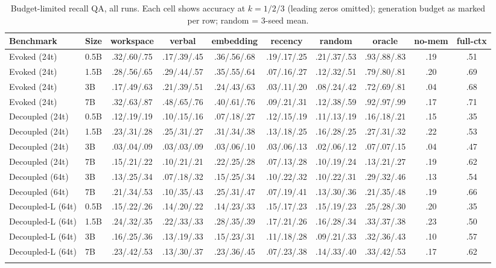 \begin{table}[h]
\centering
\caption{Budget-limited recall QA, all runs. Each cell shows accuracy at
$k{=}1/2/3$ (leading zeros omitted); generation budget
as marked per row; random = 3-seed mean.}
\label{tab:appA2}
\scriptsize
\setlength{\tabcolsep}{3.5pt}
\begin{tabular}{llcccccccc}
\toprule
Benchmark & Size & workspace & verbal & embedding & recency & random & oracle & no-mem & full-ctx \\
\midrule
Evoked (24t) & 0.5B & .32/.60/.75 & .17/.39/.45 & .36/.56/.68 & .19/.17/.25 & .21/.37/.53 & .93/.88/.83 & .19 & .51 \\
Evoked (24t) & 1.5B & .28/.56/.65 & .29/.44/.57 & .35/.55/.64 & .07/.16/.27 & .12/.32/.51 & .79/.80/.81 & .20 & .69 \\
Evoked (24t) & 3B & .17/.49/.63 & .21/.39/.51 & .24/.43/.63 & .03/.11/.20 & .08/.24/.42 & .72/.69/.81 & .04 & .68 \\
Evoked (24t) & 7B & .32/.63/.87 & .48/.65/.76 & .40/.61/.76 & .09/.21/.31 & .12/.38/.59 & .92/.97/.99 & .17 & .71 \\
\addlinespace
Decoupled (24t) & 0.5B & .12/.19/.19 & .10/.15/.16 & .07/.18/.27 & .12/.15/.19 & .11/.13/.19 & .16/.18/.21 & .15 & .35 \\
Decoupled (24t) & 1.5B & .23/.31/.28 & .25/.31/.27 & .31/.34/.38 & .13/.18/.25 & .16/.28/.25 & .27/.31/.32 & .22 & .53 \\
Decoupled (24t) & 3B & .03/.04/.09 & .03/.03/.09 & .03/.06/.10 & .03/.06/.13 & .02/.06/.12 & .07/.07/.15 & .04 & .47 \\
Decoupled (24t) & 7B & .15/.21/.22 & .10/.21/.21 & .22/.25/.28 & .07/.13/.28 & .10/.19/.24 & .13/.21/.27 & .19 & .62 \\
\addlinespace
Decoupled (64t) & 3B & .13/.25/.34 & .07/.18/.32 & .15/.25/.34 & .10/.22/.32 & .10/.22/.31 & .29/.32/.46 & .13 & .54 \\
Decoupled (64t) & 7B & .21/.34/.53 & .10/.35/.43 & .25/.31/.47 & .07/.19/.41 & .13/.30/.36 & .21/.35/.48 & .19 & .66 \\
\addlinespace
Decoupled-L (64t) & 0.5B & .15/.22/.26 & .14/.20/.22 & .14/.23/.33 & .15/.17/.23 & .15/.19/.23 & .25/.28/.30 & .20 & .35 \\
Decoupled-L (64t) & 1.5B & .24/.32/.35 & .22/.33/.33 & .28/.35/.39 & .17/.21/.26 & .16/.28/.34 & .33/.37/.38 & .23 & .50 \\
Decoupled-L (64t) & 3B & .16/.25/.36 & .13/.19/.33 & .15/.23/.31 & .11/.18/.28 & .09/.21/.33 & .32/.36/.43 & .10 & .57 \\
Decoupled-L (64t) & 7B & .23/.42/.53 & .13/.30/.37 & .23/.36/.45 & .07/.23/.38 & .14/.33/.40 & .33/.42/.53 & .17 & .62 \\
\addlinespace
\bottomrule
\end{tabular}
\end{table}
